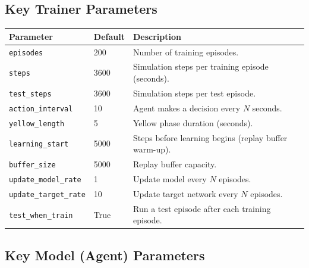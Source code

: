 \documentclass[11pt,a4paper]{article}
\begin{document}
\subsection{Key Trainer Parameters}

\begin{center}
\begin{longtable}{llp{7cm}}
\toprule
\textbf{Parameter} & \textbf{Default} & \textbf{Description} \\
\midrule
\endhead
\texttt{episodes}          & 200   & Number of training episodes. \\
\texttt{steps}             & 3600  & Simulation steps per training episode (seconds). \\
\texttt{test\_steps}       & 3600  & Simulation steps per test episode. \\
\texttt{action\_interval}  & 10    & Agent makes a decision every $N$ seconds. \\
\texttt{yellow\_length}    & 5     & Yellow phase duration (seconds). \\
\texttt{learning\_start}   & 5000  & Steps before learning begins (replay buffer warm-up). \\
\texttt{buffer\_size}      & 5000  & Replay buffer capacity. \\
\texttt{update\_model\_rate}  & 1  & Update model every $N$ episodes. \\
\texttt{update\_target\_rate} & 10 & Update target network every $N$ episodes. \\
\texttt{test\_when\_train}  & True & Run a test episode after each training episode. \\
\bottomrule
\end{longtable}
\end{center}

\subsection{Key Model (Agent) Parameters}
\end{document}
